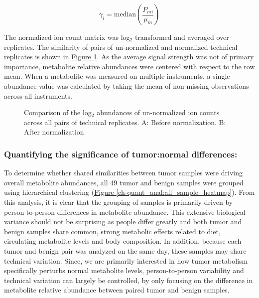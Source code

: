 \begin{equation}
\gamma_{i} = \text{median}\left(\frac{P_{mi}}{\mu_{m}}\right)
\label{ch-quant_anal:normal}
\end{equation}

The normalized ion count matrix was log$_{2}$ transformed and averaged over replicates.  The similarity of pairs of un-normalized and normalized technical replicates is shown in \hyperref[ch-quant_anal:replicate_corr]{Figure \ref{ch-quant_anal:replicate_corr}}.  As the average signal strength was not of primary importance, metabolite relative abundances were centered with respect to the row mean.  When a metabolite was measured on multiple instruments, a single abundance value was calculated by taking the mean of non-missing observations across all instruments.

\begin{figure}[h!]
\begin{center}
\hspace{1mm}

\caption[Comparison of the log$_{2}$ abundances of un-normalized ion counts for pairs of technical replicates]{Comparison of the log$_{2}$ abundances of un-normalized ion counts across all pairs of technical replicates.  A: Before normalization. B: After normalization}
\label{ch-quant_anal:replicate_corr}
\end{center}
\end{figure}

\subsubsection{Quantifying the significance of tumor:normal differences:}

To determine whether shared similarities between tumor samples were driving overall metabolite abundances, all 49 tumor and benign samples were grouped using hierarchical clustering (\hyperref[ch-quant_anal:all_sample_heatmap]{Figure \ref{ch-quant_anal:all_sample_heatmap}}). From this analysis, it is clear that the grouping of samples is primarily driven by person-to-person differences in metabolite abundance.  This extensive biological variance should not be surprising as people differ greatly and both tumor and benign samples share common, strong   metabolic effects related to diet, circulating metabolite levels and body composition.  In addition, because each tumor and benign pair was analyzed on the same day, these samples may share technical variation.  Since, we are primarily interested in how tumor metabolism specifically perturbs normal metabolite levels, person-to-person variability and technical variation can largely be controlled, by only focusing on the difference in metabolite relative abundance between paired tumor and benign samples. 

